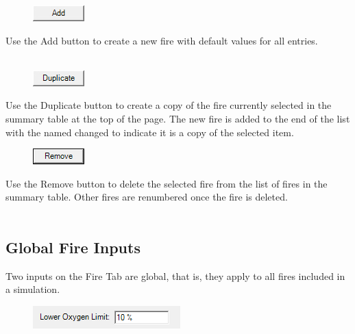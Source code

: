 \begin{figure}
  \includegraphics[width=0.781in]{FIGURES/Input_File/Add_Button}
\end{figure}

Use the Add button to create a new fire with default values for all entries. \\~ \\

\begin{figure}
  \includegraphics[width=0.781in]{FIGURES/Input_File/Duplicate_Button}
\end{figure}

Use the Duplicate button to create a copy of the fire currently selected in the summary table at the top of the page. The new fire is added to the end of the list with the named changed to indicate it is a copy of the selected item. \\

\begin{figure}
  \includegraphics[width=0.781in]{FIGURES/Input_File/Remove_Button}
\end{figure}

Use the Remove button to delete the selected fire from the list of fires in the summary table.  Other fires are renumbered once the fire is deleted. \\~ \\

\subsection{Global Fire Inputs}

Two inputs on the Fire Tab are global, that is, they apply to all fires included in a simulation.

\begin{figure}
  \includegraphics[width=2.240in]{FIGURES/Input_File/LOL}
\end{figure}

